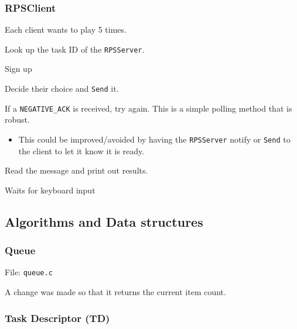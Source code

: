 \documentclass[letterpaper, 12pt]{article}
\begin{document}
\subsubsection{RPSClient%
  \label{rpsclient}%
}

Each client wants to play 5 times.
\setcounter{listcnt0}{0}
\begin{list}{.}
{
\setlength{\rightmargin}{\leftmargin}
}

\item Look up the task ID of the \texttt{RPSServer}.

\item Sign up

\item Decide their choice and \texttt{Send} it.

\item If a \texttt{NEGATIVE\_ACK} is received, try again. This is a simple polling method that is robust.
%
\begin{itemize}

\item This could be improved/avoided by having the \texttt{RPSServer} notify or \texttt{Send} to the client to let it know it is ready.

\end{itemize}

\item Read the message and print out results.

\item Waits for keyboard input
\end{list}


\subsection{Algorithms and Data structures%
  \label{algorithms-and-data-structures}%
}


\subsubsection{Queue%
  \label{queue}%
}

File: \texttt{queue.c}

A change was made so that it returns the current item count.


\subsubsection{Task Descriptor (TD)%
  \label{task-descriptor-td}%
}
\end{document}

